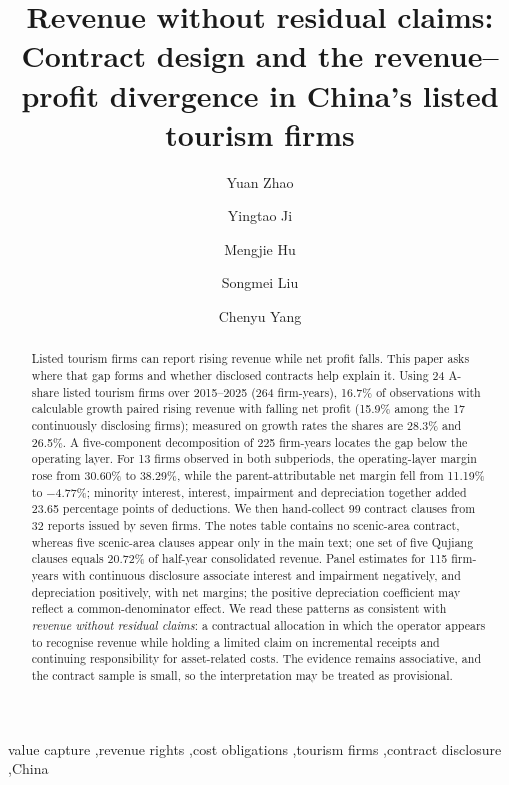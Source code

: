 \documentclass[review,3p,times]{elsarticle}
\begin{document}
\begin{frontmatter}
\title{Revenue without residual claims: Contract design and the revenue--profit
divergence in China's listed tourism firms}
\author[a]{Yuan Zhao}
\author[b]{Yingtao Ji}
\author[b]{Mengjie Hu}
\author[c]{Songmei Liu}
\author[b]{Chenyu Yang}
\begin{abstract}


Listed tourism firms can report rising revenue while net profit falls. This paper asks where that gap forms and whether disclosed contracts help explain it. Using 24 A-share listed tourism firms over 2015--2025 (264 firm-years), 16.7\% of observations with calculable growth paired rising revenue with falling net profit (15.9\% among the 17 continuously disclosing firms); measured on growth rates the shares are 28.3\% and 26.5\%. A five-component decomposition of 225 firm-years locates the gap below the operating layer. For 13 firms observed in both subperiods, the operating-layer margin rose from 30.60\% to 38.29\%, while the parent-attributable net margin fell from 11.19\% to \ensuremath{-}4.77\%; minority interest, interest, impairment and depreciation together added 23.65 percentage points of deductions. We then hand-collect 99 contract clauses from 32 reports issued by seven firms. The notes table contains no scenic-area contract, whereas five scenic-area clauses appear only in the main text; one set of five Qujiang clauses equals 20.72\% of half-year consolidated revenue. Panel estimates for 115 firm-years with continuous disclosure associate interest and impairment negatively, and depreciation positively, with net margins; the positive depreciation coefficient may reflect a common-denominator effect. We read these patterns as consistent with \emph{revenue without residual claims}: a contractual allocation in which the operator appears to recognise revenue while holding a limited claim on incremental receipts and continuing responsibility for asset-related costs. The evidence remains associative, and the contract sample is small, so the interpretation may be treated as provisional.

\end{abstract}
\begin{keyword}
value capture \sep revenue rights \sep cost obligations \sep tourism firms \sep contract disclosure \sep China
\end{keyword}
\end{frontmatter}
\linenumbers
\end{document}
